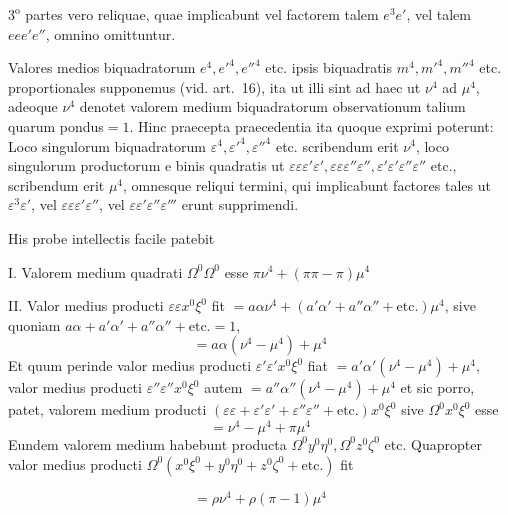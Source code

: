 \par{}%
\(3^\mathrm{o}\) partes vero reliquae, quae implicabunt vel factorem talem \(e^3e'\), vel talem \(eee'e''\), omnino omittuntur.

Valores medios biquadratorum \(e^4,\allowbreak e'^4,\allowbreak e''^4\) etc. ipsis biquadratis \(m^4,\allowbreak m'^4,\allowbreak m''^4\) etc. proportionales supponemus (vid. art.\ 16), ita ut illi sint ad haec ut \(\nu^4\) ad \(\mu^4\), adeoque \(\nu^4\) denotet valorem medium biquadratorum observationum talium quarum pondus\(=1\). Hinc praecepta praecedentia ita quoque exprimi poterunt: Loco singulorum biquadratorum \(\varepsilon^4,\varepsilon'^4,\varepsilon''^4\) etc. scribendum erit \(\nu^4\), loco singulorum productorum e binis quadratis ut \(\varepsilon\varepsilon\varepsilon'\varepsilon',\allowbreak\varepsilon\varepsilon\varepsilon''\varepsilon'',\allowbreak\varepsilon'\varepsilon'\varepsilon''\varepsilon''\) etc., scribendum erit \(\mu^4\), omnesque reliqui termini, qui implicabunt factores tales ut \(\varepsilon^3\varepsilon'\), vel \(\varepsilon\varepsilon\varepsilon'\varepsilon''\), vel \(\varepsilon\varepsilon'\varepsilon''\varepsilon'''\) erunt supprimendi.

His probe intellectis facile patebit

I. Valorem medium quadrati \(\Omega^0\Omega^0\) esse \(\pi\nu^4+(\pi\pi-\pi)\mu^4\)

II. Valor medius producti \(\varepsilon\varepsilon x^0\xi^0\) fit \(=a\alpha\nu^4+(a'\alpha'+a''\alpha''+\text{etc.})\mu^4\), sive quoniam \(a\alpha+a'\alpha'+a''\alpha''+\text{etc.}=1\),
\[
=a\alpha(\nu^4-\mu^4)+\mu^4
\]
Et quum perinde valor medius producti \(\varepsilon'\varepsilon'x^0\xi^0\) fiat \(=a'\alpha'(\nu^4-\mu^4)+\mu^4\), valor medius producti \(\varepsilon''\varepsilon''x^0\xi^0\) autem \(=a''\alpha''(\nu^4-\mu^4)+\mu^4\) et sic porro, patet, valorem medium producti \((\varepsilon\varepsilon+\varepsilon'\varepsilon'+\varepsilon''\varepsilon''+\text{etc.})x^0\xi^0\) sive \(\Omega^0x^0\xi^0\) esse
\[
=\nu^4-\mu^4+\pi\mu^4
\]
\begingroup\setlength{\rightskip}{0pt plus 2em}\noindent Eundem valorem medium habebunt producta \(\Omega^0y^0\eta^0,\allowbreak\Omega^0z^0\zeta^0\) etc. Quapropter valor medius producti \(\Omega^0(x^0\xi^0+y^0\eta^0+z^0\zeta^0+\text{etc.})\) fit\par\endgroup
\[
=\rho\nu^4+\rho(\pi-1)\mu^4
\]

